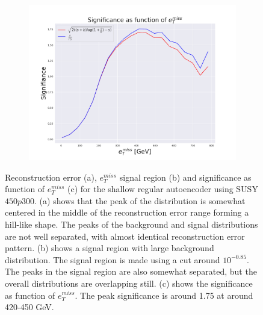 \begin{figure}[h!]
    \hfill  
    \begin{subfigure}{.49\textwidth}
        \includegraphics[width=\textwidth]{Figures/VAE_testing/small/2lep/significance_etmiss_450p0p0300_-0.8484803499636524.pdf}
        \caption{}
        \label{fig:VAE_2lep_small_signi_450}
    \end{subfigure}
    \hfill      
    \caption[2lep shallow network | $450p300$ | VAE]{Reconstruction error (a), $e_T^{miss}$ signal region (b) and significance as function of 
    $e_T^{miss}$ (c) for the shallow regular autoencoder using SUSY $450p300$.
    (a) shows that the peak of the distribution is somewhat centered in the middle 
    of the reconstruction error range forming a hill-like shape. The peaks of the background and signal 
    distributions are not well separated, with almost identical reconstruction error pattern. (b) 
    shows a signal region with large background distribution. The signal region is made using a cut around
    $10^{-0.85}$. The peaks in the signal region are also somewhat 
    separated, but the overall distributions are overlapping still. 
    (c) shows the significance as function of $e_T^{miss}$. 
The peak significance is around 1.75 at around 420-450 GeV.}
    \label{fig:VAE_2lep_small_rec_sig_signi_450}
\end{figure}


